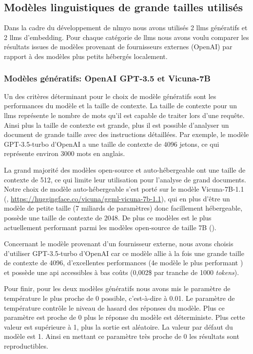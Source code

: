 \subsection{Modèles linguistiques de grande tailles utilisés}
Dans la cadre du développement de \gls{nlmyo} nous avons utilisés 2 \gls{llms} génératifs et 2 \gls{llms} d'embedding. Pour chaque catégorie de \gls{llms} nous avons voulu comparer les résultats issues de modèles provenant de fournisseurs externes (OpenAI) par rapport à des modèles plus petits hébergés localement.

\subsubsection{Modèles génératifs: OpenAI GPT-3.5 et Vicuna-7B}
Un des critères déterminant pour le choix de modèle génératifs sont les performances du modèle et la taille de contexte. La taille de contexte pour un \gls{llms} représente le nombre de mots qu'il est capable de traiter lors d'une requête. Ainsi plus la taille de contexte est grande, plus il est possible d'analyser un document de grande taille avec des instructions détaillées. Par exemple, le modèle GPT-3.5-turbo d'OpenAI a une taille de contexte de 4096 jetons, ce qui représente environ 3000 mots en anglais. 

La grand majorité des modèles open-source et auto-hébergeable ont une taille de contexte de 512, ce qui limite leur utilisation pour l'analyse de grand documents. Notre choix de modèle auto-hébergeable s'est porté sur le modèle Vicuna-7B-1.1 (\cite{chiang_vicuna_2023}, \href{https://huggingface.co/vicuna/ggml-vicuna-7b-1.1}{https://huggingface.co/vicuna/ggml-vicuna-7b-1.1}), qui en plus d'être un modèle de petite taille (7 miliards de paramètres) donc facillement hébergeable, possède une taille de contexte de 2048. De plus ce modèles est le plus actuellement performant parmi les modèles open-source de taille 7B (\cite{hendrycks_measuring_2021}). 

Concernant le modèle provenant d'un fournisseur externe, nous avons choisis d'utiliser GPT-3.5-turbo d'OpenAI car ce modèle allie à la fois une  grande taille de contexte de 4096, d'excellentes performances (4e modèle le plus performant \cite{lianmin_zheng_chatbot_2023}) et possède une \gls{api} accessibles à bas coûts (0,002\$ par tranche de 1000 \textit{tokens}).

Pour finir, pour les deux modèles génératifs nous avons mis le paramètre de température le plus proche de 0 possible, c'est-à-dire à 0.01. Le paramètre de température contrôle le niveau de hasard des réponses du modèle. Plus ce paramètre est proche de 0 plus le réponse du modèle est déterministe. Plus cette valeur est supérieure à 1, plus la sortie est aléatoire. La valeur par défaut du modèle est 1. Ainsi en mettant ce paramètre très proche de 0 les résultats sont reproductibles. 

